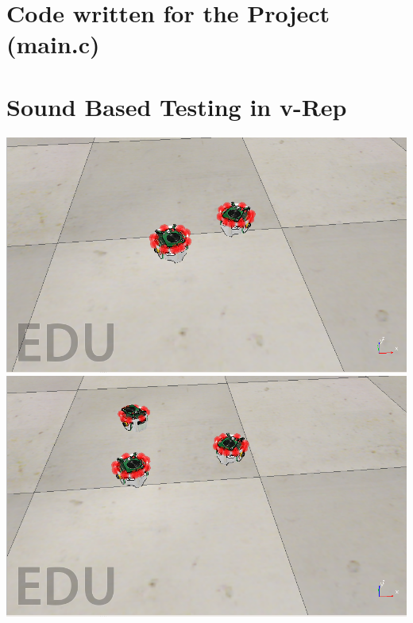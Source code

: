 \section{Code written for the Project (main.c)} \label{appendCode}


\section{Sound Based Testing in v-Rep} \label{appendSoundPics}
\includegraphics[scale=0.5]{img/puckSoundTest}
\includegraphics[scale=0.5]{img/puckSoundTest2}